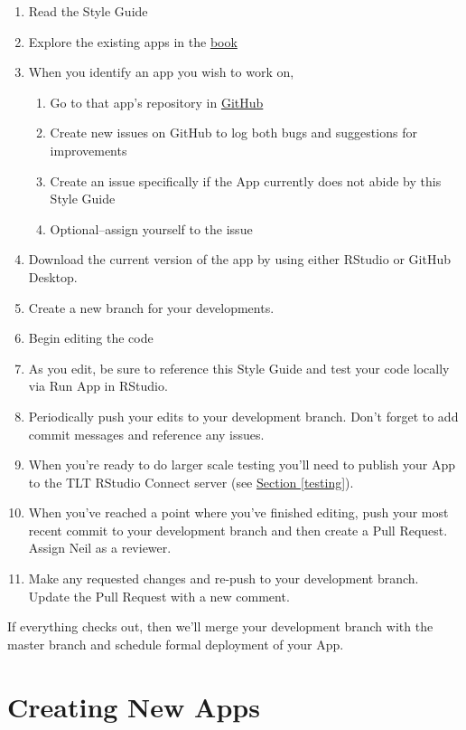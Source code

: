 \documentclass[
]{book}
\providecommand{\tightlist}{%
  \setlength{\itemsep}{0pt}\setlength{\parskip}{0pt}}
\begin{document}
\begin{enumerate}
\def\labelenumi{\arabic{enumi}.}
\tightlist
\item
  Read the Style Guide
\item
  Explore the existing apps in the \href{https://sites.psu.edu/shinyapps/}{book}
\item
  When you identify an app you wish to work on,

  \begin{enumerate}
  \def\labelenumii{\alph{enumii}.}
  \tightlist
  \item
    Go to that app's repository in \href{https://github.com/EducationShinyAppTeam}{GitHub}
  \item
    Create new issues on GitHub to log both bugs and suggestions for improvements
  \item
    Create an issue specifically if the App currently does not abide by this Style Guide
  \item
    Optional--assign yourself to the issue
  \end{enumerate}
\item
  Download the current version of the app by using either RStudio or GitHub Desktop.
\item
  Create a new branch for your developments.
\item
  Begin editing the code
\item
  As you edit, be sure to reference this Style Guide and test your code locally via Run App in RStudio.
\item
  Periodically push your edits to your development branch. Don't forget to add commit messages and reference any issues.
\item
  When you're ready to do larger scale testing you'll need to publish your App to the TLT RStudio Connect server (see \protect\hyperlink{testing}{Section \ref{testing}}).
\item
  When you've reached a point where you've finished editing, push your most recent commit to your development branch and then create a Pull Request. Assign Neil as a reviewer.
\item
  Make any requested changes and re-push to your development branch. Update the Pull Request with a new comment.
\end{enumerate}

If everything checks out, then we'll merge your development branch with the master branch and schedule formal deployment of your App.

\hypertarget{creating-new-apps}{%
\section{Creating New Apps}\label{creating-new-apps}}
\end{document}
